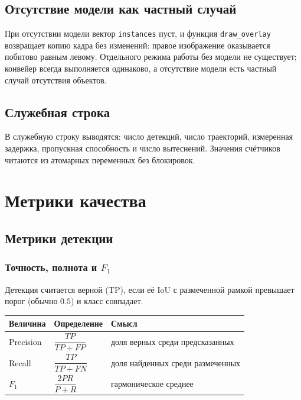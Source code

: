 \documentclass[11pt,a4paper]{article}
\theoremstyle{definition}
\theoremstyle{remark}
\begin{document}
\subsection{Отсутствие модели как частный случай}

При отсутствии модели вектор \texttt{instances} пуст, и функция
\texttt{draw\_overlay} возвращает копию кадра без изменений: правое
изображение оказывается побитово равным левому. Отдельного режима работы без
модели не существует; конвейер всегда выполняется одинаково, а отсутствие
модели есть частный случай отсутствия объектов.

\subsection{Служебная строка}

В служебную строку выводятся: число детекций, число траекторий, измеренная
задержка, пропускная способность и число вытеснений. Значения счётчиков
читаются из атомарных переменных без блокировок.

\section{Метрики качества}
\label{sec:metrics}

\subsection{Метрики детекции}

\subsubsection{Точность, полнота и $F_1$}

Детекция считается верной (TP), если её $\mathrm{IoU}$ с размеченной рамкой
превышает порог (обычно $0.5$) и класс совпадает.

\begin{center}
\begin{tabular}{lll}
\toprule
Величина & Определение & Смысл \\
\midrule
Precision & $\dfrac{TP}{TP + FP}$ & доля верных среди предсказанных \\
Recall & $\dfrac{TP}{TP + FN}$ & доля найденных среди размеченных \\
$F_1$ & $\dfrac{2PR}{P+R}$ & гармоническое среднее \\
\bottomrule
\end{tabular}
\end{center}
\end{document}
